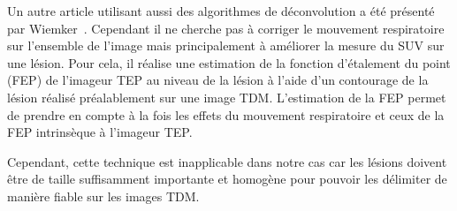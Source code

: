 Un autre article utilisant aussi des algorithmes de déconvolution a été présenté par Wiemker~\cite{wiemker2008combined}. Cependant il ne cherche pas à corriger le mouvement respiratoire sur l'ensemble de l'image mais principalement à améliorer la mesure du SUV sur une lésion. Pour cela, il réalise une estimation de la fonction d'étalement du point (FEP) de l'imageur TEP au niveau de la lésion à l'aide d'un contourage de la lésion réalisé préalablement sur une image TDM. L'estimation de la FEP permet de prendre en compte à la fois les effets du mouvement respiratoire et ceux de la FEP intrinsèque à l'imageur TEP. 

Cependant, cette technique est inapplicable dans notre cas car les lésions doivent être de taille suffisamment importante et homogène pour pouvoir les délimiter de manière fiable sur les images TDM.
